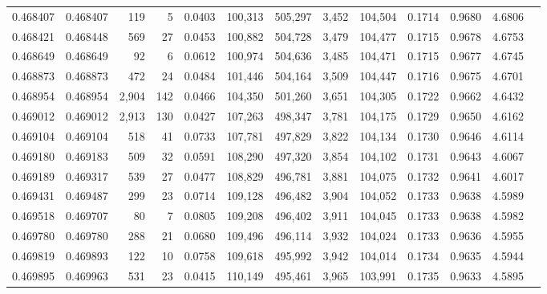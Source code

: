 \begin{tabular}{rrrrrrrrrrrrr}
0.468407 & 0.468407 &   119 &     5 &                                     0.0403 & 100,313 & 505,297 &   3,452 & 104,504 & 0.1714 & 0.9680 & 4.6806 \\
0.468421 & 0.468448 &   569 &    27 &                                     0.0453 & 100,882 & 504,728 &   3,479 & 104,477 & 0.1715 & 0.9678 & 4.6753 \\
0.468649 & 0.468649 &    92 &     6 &                                     0.0612 & 100,974 & 504,636 &   3,485 & 104,471 & 0.1715 & 0.9677 & 4.6745 \\
0.468873 & 0.468873 &   472 &    24 &                                     0.0484 & 101,446 & 504,164 &   3,509 & 104,447 & 0.1716 & 0.9675 & 4.6701 \\
0.468954 & 0.468954 & 2,904 &   142 &                                     0.0466 & 104,350 & 501,260 &   3,651 & 104,305 & 0.1722 & 0.9662 & 4.6432 \\
0.469012 & 0.469012 & 2,913 &   130 &                                     0.0427 & 107,263 & 498,347 &   3,781 & 104,175 & 0.1729 & 0.9650 & 4.6162 \\
0.469104 & 0.469104 &   518 &    41 &                                     0.0733 & 107,781 & 497,829 &   3,822 & 104,134 & 0.1730 & 0.9646 & 4.6114 \\
0.469180 & 0.469183 &   509 &    32 &                                     0.0591 & 108,290 & 497,320 &   3,854 & 104,102 & 0.1731 & 0.9643 & 4.6067 \\
0.469189 & 0.469317 &   539 &    27 &                                     0.0477 & 108,829 & 496,781 &   3,881 & 104,075 & 0.1732 & 0.9641 & 4.6017 \\
0.469431 & 0.469487 &   299 &    23 &                                     0.0714 & 109,128 & 496,482 &   3,904 & 104,052 & 0.1733 & 0.9638 & 4.5989 \\
0.469518 & 0.469707 &    80 &     7 &                                     0.0805 & 109,208 & 496,402 &   3,911 & 104,045 & 0.1733 & 0.9638 & 4.5982 \\
0.469780 & 0.469780 &   288 &    21 &                                     0.0680 & 109,496 & 496,114 &   3,932 & 104,024 & 0.1733 & 0.9636 & 4.5955 \\
0.469819 & 0.469893 &   122 &    10 &                                     0.0758 & 109,618 & 495,992 &   3,942 & 104,014 & 0.1734 & 0.9635 & 4.5944 \\
0.469895 & 0.469963 &   531 &    23 &                                     0.0415 & 110,149 & 495,461 &   3,965 & 103,991 & 0.1735 & 0.9633 & 4.5895 \\

\end{tabular}
